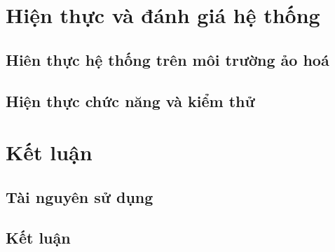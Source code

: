 \documentclass[12pt,titlepage,a4paper]{article}
\begin{document}
	\section{Hiện thực và đánh giá hệ thống}
	\subsection{Hiên thực hệ thống trên môi trường ảo hoá}
	\subsection{Hiện thực chức năng và kiểm thử}
	\section{Kết luận}
	\subsection{Tài nguyên sử dụng}
	\subsection{Kết luận}
	
\end{document}
